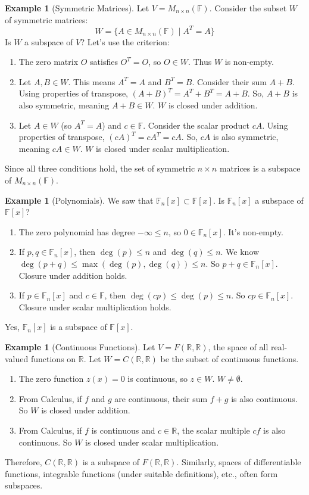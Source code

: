 \documentclass[11pt]{article}
\theoremstyle{definition}
\newtheorem{example}[theorem]{Example}
\newcommand{\F}{\mathbb{F}}
\newcommand{\R}{\mathbb{R}}
\newcommand{\M}[2]{M_{#1 \times #2}}
\newcommand{\Fn}[1]{\mathbb{F}_{#1}[x]}
\newcommand{\Fx}{\mathbb{F}[x]}
\begin{document}
\begin{example}[Symmetric Matrices]
Let $V = \M{n}{n}(\F)$. Consider the subset $W$ of symmetric matrices:
\[ W = \{ A \in \M{n}{n}(\F) \mid A^T = A \} \]
Is $W$ a subspace of $V$? Let's use the criterion:
\begin{enumerate}
    \item The zero matrix $O$ satisfies $O^T = O$, so $O \in W$. Thus $W$ is non-empty.
    \item Let $A, B \in W$. This means $A^T = A$ and $B^T = B$. Consider their sum $A+B$. Using properties of transpose, $(A+B)^T = A^T + B^T = A + B$. So, $A+B$ is also symmetric, meaning $A+B \in W$. $W$ is closed under addition.
    \item Let $A \in W$ (so $A^T = A$) and $c \in \F$. Consider the scalar product $cA$. Using properties of transpose, $(cA)^T = c A^T = c A$. So, $cA$ is also symmetric, meaning $cA \in W$. $W$ is closed under scalar multiplication.
\end{enumerate}
Since all three conditions hold, the set of symmetric $n \times n$ matrices is a subspace of $\M{n}{n}(\F)$.
\end{example}

\begin{example}[Polynomials]
We saw that $\Fn{n} \subset \Fx$. Is $\Fn{n}$ a subspace of $\Fx$?
\begin{enumerate}
    \item The zero polynomial has degree $-\infty \le n$, so $0 \in \Fn{n}$. It's non-empty.
    \item If $p, q \in \Fn{n}$, then $\deg(p) \le n$ and $\deg(q) \le n$. We know $\deg(p+q) \le \max(\deg(p), \deg(q)) \le n$. So $p+q \in \Fn{n}$. Closure under addition holds.
    \item If $p \in \Fn{n}$ and $c \in \F$, then $\deg(cp) \le \deg(p) \le n$. So $cp \in \Fn{n}$. Closure under scalar multiplication holds.
\end{enumerate}
Yes, $\Fn{n}$ is a subspace of $\Fx$.
\end{example}

\begin{example}[Continuous Functions]
Let $V = F(\R, \R)$, the space of all real-valued functions on $\R$. Let $W = C(\R, \R)$ be the subset of continuous functions.
\begin{enumerate}
    \item The zero function $z(x)=0$ is continuous, so $z \in W$. $W \neq \emptyset$.
    \item From Calculus, if $f$ and $g$ are continuous, their sum $f+g$ is also continuous. So $W$ is closed under addition.
    \item From Calculus, if $f$ is continuous and $c \in \R$, the scalar multiple $cf$ is also continuous. So $W$ is closed under scalar multiplication.
\end{enumerate}
Therefore, $C(\R, \R)$ is a subspace of $F(\R, \R)$. Similarly, spaces of differentiable functions, integrable functions (under suitable definitions), etc., often form subspaces.
\end{example}
\end{document}
